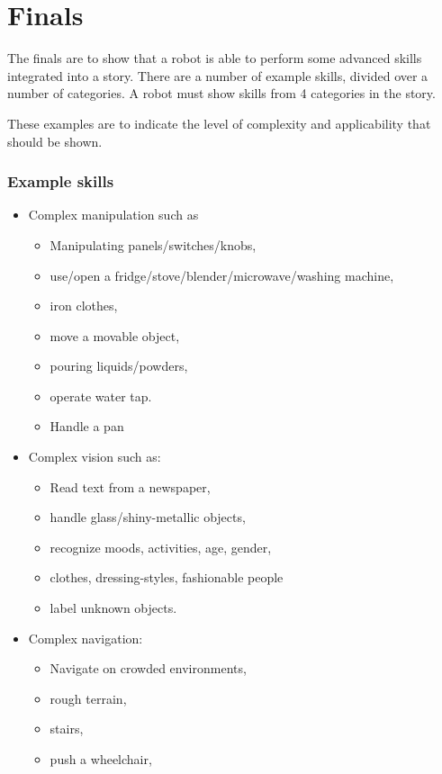 \section{Finals}

The finals are to show that a robot is able to perform some advanced skills integrated into a story.
There are a number of example skills, divided over a number of categories. 
A robot must show skills from 4 categories in the story.

These examples are to indicate the level of complexity and applicability that should be shown. 

\subsubsection{Example skills}
\begin{itemize}
  \item Complex manipulation such as 
  \begin{itemize}
    \item Manipulating panels/switches/knobs, 
    \item use/open a fridge/stove/blender/microwave/washing machine, 
    \item iron clothes, 
    \item move a movable object, 
    \item pouring liquids/powders, 
    \item operate water tap.
    \item Handle a pan
    \end{itemize}
  \item Complex vision such as: 
    \begin{itemize}
      \item Read text from a newspaper, 
      \item handle glass/shiny-metallic objects, 
      \item recognize moods, activities, age, gender, 
      \item clothes, dressing-styles, fashionable people
      \item label unknown objects.
    \end{itemize}
  \item Complex navigation: 
    \begin{itemize}
      \item Navigate on crowded environments, 
      \item rough terrain, 
      \item stairs, 
      \item push a wheelchair, 

\end{itemize}
\end{itemize}
